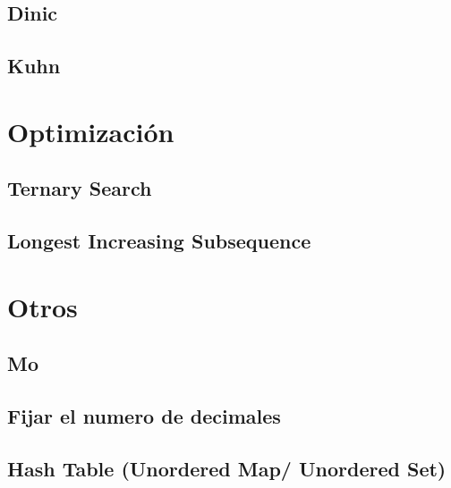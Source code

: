 \documentclass[a4paper,11pt,landscape,twocolumn]{article}
\begin{document}
\subsection{Dinic}



\subsection{Kuhn}



\section{Optimización}

\subsection{Ternary Search}



\subsection{Longest Increasing Subsequence}



\section{Otros}

\subsection{Mo}



\subsection{Fijar el numero de decimales}



\subsection{Hash Table (Unordered Map/ Unordered Set)}


\end{document}
